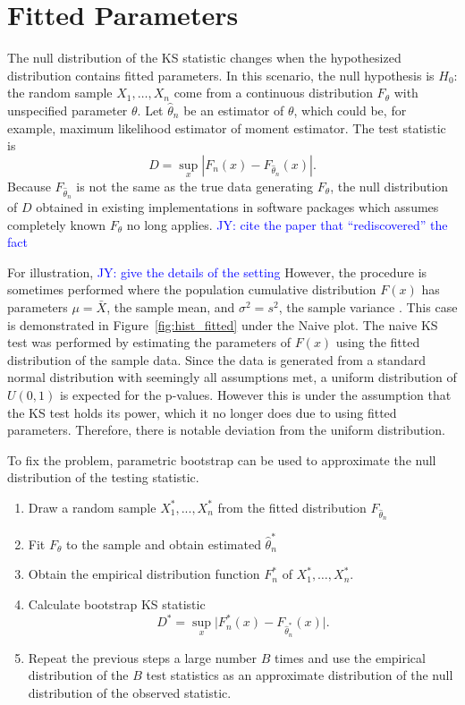 \documentclass[12pt, letterpaper, titlepage]{article}
\newcommand{\jy}[1]{\textcolor{blue}{JY: #1}}
\begin{document}
\section{Fitted Parameters}\label{sec:fitted}

The null distribution of the KS statistic changes when the hypothesized
distribution contains fitted parameters. In this scenario, the null hypothesis
is $H_0$: the random sample $X_1, \ldots, X_n$ come from a continuous
distribution $F_{\theta}$ with unspecified parameter $\theta$.
Let $\hat\theta_n$ be an estimator of $\theta$, which could be, for example,
maximum likelihood estimator of moment estimator. The test statistic is
\begin{equation}
  \label{eq:ks_fitted}
  D = \sup_x | F_n(x) - F_{\hat\theta_n}(x) |.
\end{equation}
Because $F_{\hat\theta_n}$ is not the same as the true data generating
$F_\theta$, the null distribution of $D$ obtained in existing implementations in
software packages which assumes completely known $F_\theta$ no long applies.
\jy{cite the paper that ``rediscovered'' the fact}


For illustration, \jy{give the details of the setting}
However, the procedure is sometimes performed where the population cumulative 
distribution $F(x)$ has parameters $\mu=\bar X$, the sample mean, and $\sigma^2=s^2$, 
the sample variance \citep{Lilliefors}. This case is demonstrated in Figure~\ref{fig:hist_fitted} 
under the Naive plot. The naive KS test was performed by estimating the parameters 
of $F(x)$ using the fitted distribution of the sample data. Since the data is generated 
from a standard normal distribution with seemingly all assumptions met, a uniform 
distribution of $U(0,1)$ is expected for the p-values. However this is under the 
assumption that the KS test holds its power, which it no longer does due to using 
fitted parameters. Therefore, there is notable deviation from the uniform distribution. 


To fix the problem, parametric bootstrap can be used to approximate the null
distribution of the testing statistic. 
\begin{enumerate}
  \item 
    Draw a random sample $X_1^*,...,X_n^*$ from the fitted distribution $F_{\hat\theta_n}$
  \item 
    Fit $F_\theta$ to the sample and obtain estimated $\hat\theta_n^*$
  \item
    Obtain the empirical distribution function $F_n^*$ of $X_1^*, \ldots, X_n^*$.
  \item 
    Calculate bootstrap KS statistic
    \[
      D^* = \sup_x \lvert F_n^* (x)- F_{\hat\theta_n^*}(x) \rvert.
    \]
  \item
    Repeat the previous steps a large number $B$ times and use the empirical
    distribution of the $B$ test statistics as an approximate distribution of
    the null distribution of the observed statistic.      
\end{enumerate}
\end{document}
